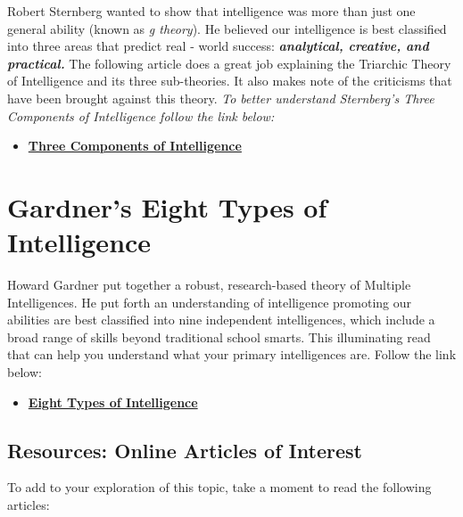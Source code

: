 \documentclass[
]{book}
\providecommand{\tightlist}{%
  \setlength{\itemsep}{0pt}\setlength{\parskip}{0pt}}
\begin{document}
Robert Sternberg wanted to show that intelligence was more than just one general ability (known as \emph{g theory}). He believed our intelligence is best classified into three areas that predict real - world success: \textbf{\emph{analytical, creative, and practical.}} The following article does a great job explaining the Triarchic Theory of Intelligence and its three sub-theories. It also makes note of the criticisms that have been brought against this theory. \emph{To better understand Sternberg's Three Components of Intelligence follow the link below:}

\begin{itemize}
\tightlist
\item
  \href{https://www.thoughtco.com/triarchic-theory-of-intelligence-4172497}{\textbf{Three Components of Intelligence}}
\end{itemize}

\hypertarget{gardners-eight-types-of-intelligence}{%
\section{Gardner's Eight Types of Intelligence}\label{gardners-eight-types-of-intelligence}}

Howard Gardner put together a robust, research-based theory of Multiple Intelligences. He put forth an understanding of intelligence promoting our abilities are best classified into nine independent intelligences, which include a broad range of skills beyond traditional school smarts. This illuminating read that can help you understand what your primary intelligences are. Follow the link below:

\begin{itemize}
\tightlist
\item
  \href{https://www.institute4learning.com/resources/articles/multiple-intelligences/}{\textbf{Eight Types of Intelligence}}
\end{itemize}

\hypertarget{resources-online-articles-of-interest-2}{%
\subsection*{Resources: Online Articles of Interest}\label{resources-online-articles-of-interest-2}}

To add to your exploration of this topic, take a moment to read the following articles:
\end{document}
